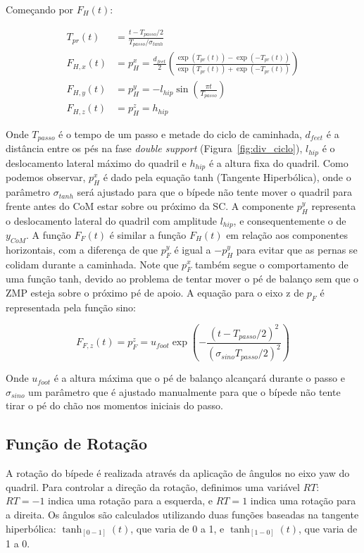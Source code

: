 Começando por $F_H(t)$:

\begin{align}
    \label{eq:trajetoria_quadril}
    T_{pr}(t) &= \frac{t - T_{passo}/2}{T_{passo}/\sigma_{tanh}} \\
    F_{H,x}(t) &= p_{H}^x = \frac{d_{feet}}{2}\left(\frac{\exp(T_{pr}(t)) - \exp(-T_{pr}(t))}{\exp(T_{pr}(t)) + \exp(-T_{pr}(t))}\right) \\
    F_{H,y}(t) &= p_{H}^y = -l_{hip}\sin\left(\frac{\pi t}{T_{passo}}\right) \\
    F_{H,z}(t) &= p_{H}^z = h_{hip}
\end{align}

Onde $T_{passo}$ é o tempo de um passo e metade do ciclo de caminhada, $d_{feet}$ é a distância entre os pés na fase \textit{double support} (Figura~\ref{fig:div_ciclo}), $l_{hip}$ é o deslocamento lateral máximo do quadril e $h_{hip}$ é a altura fixa do quadril. Como podemos observar, $p_{H}^x$ é dado pela equação tanh (Tangente Hiperbólica), onde o parâmetro $\sigma_{tanh}$ será ajustado para que o bípede não tente mover o quadril para frente antes do CoM estar sobre ou próximo da SC. A componente $p_{H}^y$ representa o deslocamento lateral do quadril com amplitude $l_{hip}$, e consequentemente o de $y_{CoM}$. A função $F_F(t)$ é similar a função $F_H(t)$ em relação aos componentes horizontais, com a diferença de que $p_{F}^y$ é igual a $-p_{H}^y$ para evitar que as pernas se colidam durante a caminhada. Note que $p_{F}^x$ também segue o comportamento de uma função tanh, devido ao problema de tentar mover o pé de balanço sem que o ZMP esteja sobre o próximo pé de apoio.
A equação para o eixo z de $p_{F}$ é representada pela função sino:

\begin{equation}
    \label{eq:trajetoria_pe}
    F_{F,z}(t) = p_{F}^z = u_{foot}\exp\left(-\frac{(t-T_{passo}/2)^2}{(\sigma_{sino}T_{passo}/2)^2}\right)
\end{equation}

Onde $u_{foot}$ é a altura máxima que o pé de balanço alcançará durante o passo e $\sigma_{sino}$ um parâmetro que é ajustado manualmente para que o bípede não tente tirar o pé do chão nos momentos iniciais do passo.

\subsection{Função de Rotação}
\label{subsec:funcao_rotacao}

A rotação do bípede é realizada através da aplicação de ângulos no eixo yaw do quadril. Para controlar a direção da rotação, definimos uma variável $RT$: $RT=-1$ indica uma rotação para a esquerda, e $RT=1$ indica uma rotação para a direita. Os ângulos são calculados utilizando duas funções baseadas na tangente hiperbólica: $\tanh_{[0-1]}(t)$, que varia de 0 a 1, e $\tanh_{[1-0]}(t)$, que varia de 1 a 0.

